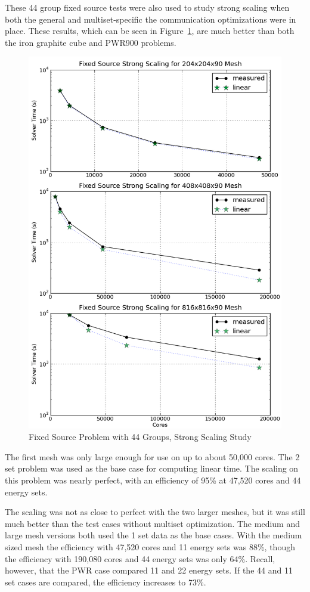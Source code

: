These 44 group fixed source tests were also used to study strong scaling when both the general and multiset-specific the communication optimizations were in place. These results, which can be seen in Figure~\ref{fig:FxdStrong}, are much better than both the iron graphite cube and PWR900 problems. 
%
\begin{figure}[!h]
  \begin{center}
    \includegraphics [width=.8\textwidth, height=0.9\textheight ] {FxdSrcKrylovStrongScaling}
  \end{center}
  \caption{Fixed Source Problem with 44 Groups, Strong Scaling Study}
  \label{fig:FxdStrong}
\end{figure}

The first mesh was only large enough for use on up to about 50,000 cores. The 2 set problem was used as the base case for computing linear time. The scaling on this problem was nearly perfect, with an efficiency of 95\% at 47,520 cores and 44 energy sets. 

The scaling was not as close to perfect with the two larger meshes, but it was still much better than the test cases without multiset optimization. The medium and large mesh versions both used the 1 set data as the base cases. With the medium sized mesh the efficiency with 47,520 cores and 11 energy sets was 88\%, though the efficiency with 190,080 cores and 44 energy sets was only 64\%. Recall, however, that the PWR case compared 11 and 22 energy sets. If the 44 and 11 set cases are compared, the efficiency increases to 73\%.

